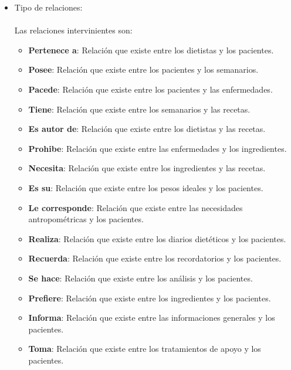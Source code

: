 \begin{itemize}
\begin{table}[H]
\end{table}
\item Tipo de relaciones:\\\\
Las relaciones intervinientes son:
\begin{itemize}
\item \textbf{Pertenece a}: Relación que existe entre los dietistas y los pacientes.
\item \textbf{Posee}: Relación que existe entre los pacientes y los semanarios.
\item \textbf{Pacede}: Relación que existe entre los pacientes y las enfermedades.
\item \textbf{Tiene}: Relación que existe entre los semanarios y las recetas.
\item \textbf{Es autor de}: Relación que existe entre los dietistas y las recetas.
\item \textbf{Prohibe}: Relación que existe entre las enfermedades y los ingredientes.
\item \textbf{Necesita}: Relación que existe entre los ingredientes y las recetas.
\item \textbf{Es su}: Relación que existe entre los pesos ideales y los pacientes.
\item \textbf{Le corresponde}: Relación que existe entre las necesidades antropométricas y los pacientes.
\item \textbf{Realiza}: Relación que existe entre los diarios dietéticos y los pacientes.
\item \textbf{Recuerda}: Relación que existe entre los recordatorios y los pacientes.
\item \textbf{Se hace}: Relación que existe entre los análisis y los pacientes.
\item \textbf{Prefiere}: Relación que existe entre los ingredientes y los pacientes.
\item \textbf{Informa}: Relación que existe entre las informaciones generales y los pacientes.
\item \textbf{Toma}: Relación que existe entre los tratamientos de apoyo y los pacientes.
\end{itemize}


\end{itemize}
